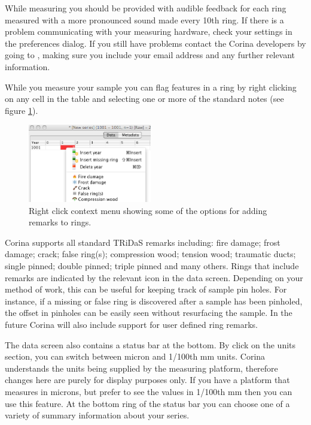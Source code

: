 While measuring you should be provided with audible feedback for each ring measured with a more pronounced sound made every 10th ring. If there is a problem communicating with your measuring hardware, check your settings in the preferences dialog. If you still have problems contact the Corina developers by going to , making sure you include your email address and any further relevant information.


While you measure your sample you can flag features in a ring by right clicking on any cell in the table and selecting one or more of the standard notes (see figure \ref{fig:ringremarks}).

\begin{figure}
  \begin{center}
    \includegraphics[width=0.48\textwidth]{Images/ringremarks.png}
  \end{center}
  \caption{Right click context menu showing some of the options for adding remarks to rings.}
  \label{fig:ringremarks}
\end{figure}

Corina supports all standard TRiDaS remarks including: fire damage; frost damage; crack; false ring(s); compression wood; tension wood; traumatic ducts; single pinned; double pinned; triple pinned and many others.  Rings that include remarks are indicated by the relevant icon in the data screen.  Depending on your method of work, this can be useful for keeping track of sample pin holes.  For instance, if a missing or false ring is discovered after a sample has been pinholed, the offset in pinholes can be easily seen without resurfacing the sample.  In the future Corina will also include support for user defined ring remarks.  

The data screen also contains a status bar at the bottom. By click on the units section, you can switch between micron and 1/100th mm units. Corina understands the units being supplied by the measuring platform, therefore changes here are purely for display purposes only. If you have a platform that measures in microns, but prefer to see the values in 1/100th mm then you can use this feature. At the bottom ring of the status bar you can choose one of a variety of summary information about your series.

